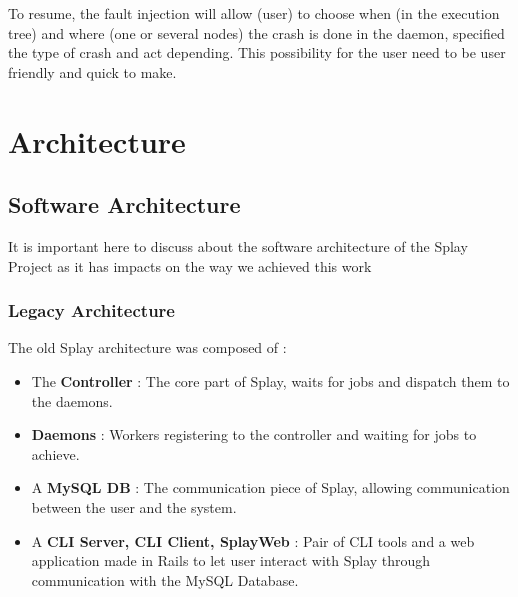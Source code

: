 \documentclass{eplmastersthesis}
\begin{document}
        To resume, the fault injection will allow (user) to choose when (in
        the execution tree) and where (one or several nodes) the crash is done
        in the daemon, specified the type of crash and act depending. This
        possibility for the user need to be user friendly and quick to make.


  \chapter{Architecture}

    \section{Software Architecture}

      It is important here to discuss about the software architecture of the
      Splay Project as it has impacts on the way we achieved this work

      \subsection{Legacy Architecture}

        The old Splay architecture was composed of :

        \begin{itemize}
          \item The \textbf{Controller} : The core part of Splay, waits for jobs
          and dispatch them to the daemons.
          \item \textbf{Daemons} : Workers registering to the controller and waiting
          for jobs to achieve.
          \item A \textbf{MySQL DB} : The communication piece of Splay, allowing
          communication between the user and the system.
          \item A \textbf{CLI Server, CLI Client, SplayWeb} : Pair of CLI tools
          and a web application made in Rails to let user interact with
          Splay through communication with the MySQL Database.
        \end{itemize}
\end{document}
